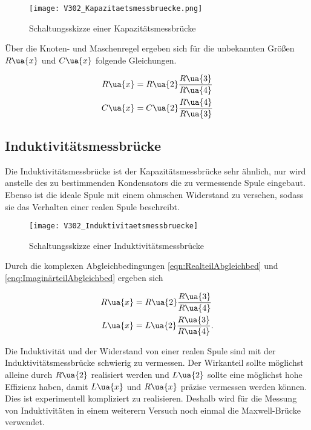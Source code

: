 \begin{figure}
  \texttt{[image: V302\_Kapazitaetsmessbruecke.png]}
  \caption{Schaltungsskizze einer Kapazitätsmessbrücke\cite{anleitung01}}
  \label{fig:Kapazitätsmessbrücke}
\end{figure}

Über die Knoten- und Maschenregel ergeben sich für die unbekannten Größen
$R\ua{x}$ und $C\ua{x}$ folgende Gleichungen.

\begin{align}
  R\ua{x} &= R\ua{2}\frac{R\ua{3}}{R\ua{4}}\label{KapazitätsmessbrückeRx}\\
  C\ua{x} &= C\ua{2}\frac{R\ua{4}}{R\ua{3}}\label{KapazitätsmessbrückeLx}
\end{align}

\subsection{Induktivitätsmessbrücke}

Die Induktivitätsmessbrücke ist der Kapazitätsmessbrücke sehr ähnlich, nur wird
anstelle des zu bestimmenden Kondensators die zu vermessende Spule eingebaut.
Ebenso ist die ideale Spule mit einem ohmschen Widerstand zu versehen, sodass
sie das Verhalten einer realen Spule beschreibt.
\begin{figure}
  \texttt{[image: V302\_Induktivitaetsmessbruecke]}
  \caption{Schaltungsskizze einer Induktivitätsmessbrücke\cite{anleitung01}}
  \label{fig:Induktivitätsmessbrücke}
\end{figure}

Durch die komplexen Abgleichbedingungen \eqref{eqn:RealteilAbgleichbed} und
\eqref{enq:ImaginärteilAbgleichbed} ergeben sich

\begin{align}
  R\ua{x} &= R\ua{2}\frac{R\ua{3}}{R\ua{4}}\label{InduktivitätmessbrückeRx}\\
  L\ua{x} &= L\ua{2}\frac{R\ua{3}}{R\ua{4}}.\label{InduktivitätmessbrückeLx}
\end{align}

Die Induktivität und der Widerstand von einer realen Spule sind mit der
Induktivitätsmessbrücke schwierig zu vermessen. Der Wirkanteil sollte
möglichst alleine durch $R\ua{2}$ realisiert werden und $L\ua{2}$ sollte
eine möglichst hohe Effizienz haben, damit $L\ua{x}$ und $R\ua{x}$ präzise vermessen
werden können. Dies ist experimentell kompliziert zu realisieren.
Deshalb wird für die Messung von Induktivitäten in einem weiterern
Versuch noch einmal die Maxwell-Brücke verwendet.

